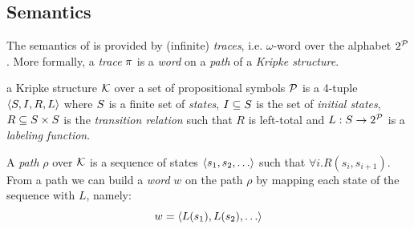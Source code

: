 \subsection{Semantics}\label{ltl-semantics}
The semantics of \LTL is provided by (infinite) \textit{traces}, i.e. $\omega$-word over the alphabet $2^{\mathcal{P}}$. More formally, a \emph{trace} $\pi$ is a \emph{word} on a \emph{path} of a \emph{Kripke structure}.
\begin{definition}\label{kripke}
	a Kripke structure $\mathcal{K}$ over a set of propositional symbols $\mathcal{P}$ is a 4-tuple $\langle S, I, R, L \rangle$ where $S$ is a finite set of \emph{states}, $I\subseteq S$ is the set of \emph{initial states}, $R \subseteq S \times S$ is the \emph{transition relation} such that $R$ is left-total and $L: S \to 2^{\mathcal{P}}$ is a \emph{labeling function}.
\end{definition}
A \emph{path} $\rho$ over $\mathcal{K}$ is a sequence of states $\tup{s_1, s_2, \dots}$ such that $\forall i. R(s_i, s_{i+1})$. From a path we can build a \emph{word} $w$ on the path $\rho$ by  
mapping each state of the sequence with $L$, namely:
\[
w = \tup{L(s_1), L(s_2), \dots}
\]

